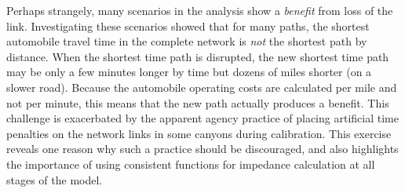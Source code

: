\documentclass[]{ascelike-new}
\begin{document}
Perhaps strangely, many scenarios in the analysis show a \emph{benefit}
from loss of the link. Investigating these scenarios showed that for
many paths, the shortest automobile travel time in the complete network
is \emph{not} the shortest path by distance. When the shortest time path
is disrupted, the new shortest time path may be only a few minutes
longer by time but dozens of miles shorter (on a slower road). Because
the automobile operating costs are calculated per mile and not per
minute, this means that the new path actually produces a benefit. This
challenge is exacerbated by the apparent agency practice of placing
artificial time penalties on the network links in some canyons during
calibration. This exercise reveals one reason why such a practice should
be discouraged, and also highlights the importance of using consistent
functions for impedance calculation at all stages of the model.
\end{document}
